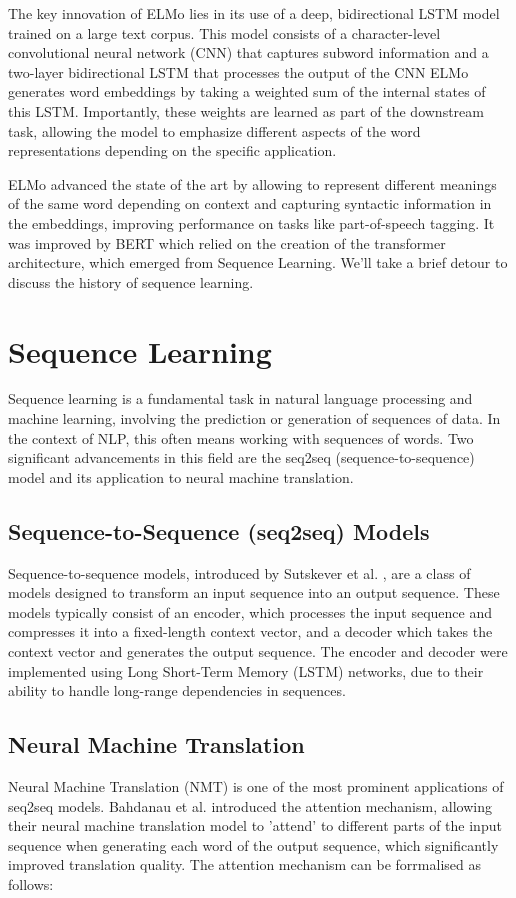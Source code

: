 \documentclass[a4paper, oneside]{discothesis}
\begin{document}
The key innovation of ELMo lies in its use of a deep, bidirectional LSTM model trained on a large text corpus. This model consists of a character-level convolutional neural network (CNN) that captures subword information and a two-layer bidirectional LSTM that processes the output of the CNN
ELMo generates word embeddings by taking a weighted sum of the internal states of this LSTM. Importantly, these weights are learned as part of the downstream task, allowing the model to emphasize different aspects of the word representations depending on the specific application.

ELMo advanced the state of the art by allowing to represent different meanings of the same word depending on context and capturing syntactic information in the embeddings, improving performance on tasks like part-of-speech tagging. It was improved by BERT which relied on the creation of the transformer architecture, which emerged from Sequence Learning. We'll take a brief detour to discuss the history of sequence learning. 

\section{Sequence Learning}
Sequence learning is a fundamental task in natural language processing and machine learning, involving the prediction or generation of sequences of data. In the context of NLP, this often means working with sequences of words. Two significant advancements in this field are the seq2seq (sequence-to-sequence) model and its application to neural machine translation.

\subsection{Sequence-to-Sequence (seq2seq) Models}
Sequence-to-sequence models, introduced by Sutskever et al. \cite{sutskever2014sequence}, are a class of models designed to transform an input sequence into an output sequence. 
These models typically consist of an encoder, which processes the input sequence and compresses it into a fixed-length context vector, and a decoder which takes the context vector and generates the output sequence.
The encoder and decoder were implemented using Long Short-Term Memory (LSTM) networks, due to their ability to handle long-range dependencies in sequences.

\subsection{Neural Machine Translation}
Neural Machine Translation (NMT) is one of the most prominent applications of seq2seq models.
Bahdanau et al. \cite{bahdanau2014neural} introduced the attention mechanism, allowing their neural machine translation model to 'attend' to different parts of the input sequence when generating each word of the output sequence, which significantly improved translation quality.
The attention mechanism can be forrmalised as follows:
\end{document}
